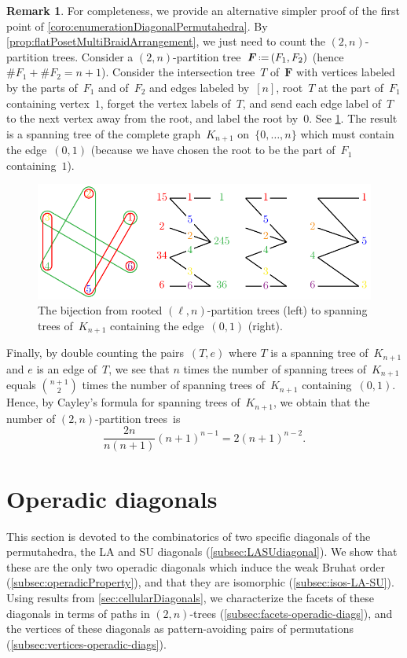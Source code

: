 \documentclass{amsart}
\theoremstyle{definition}
\newtheorem{remark}[theorem]{Remark}
\renewcommand{\b}[1]{{\boldsymbol{#1}}} %
\newcommand{\eqdef}{\mbox{\,\raisebox{0.2ex}{\scriptsize\ensuremath{\mathrm:}}\ensuremath{=}\,}} %
\renewcommand{\b}[1]{\boldsymbol{#1}} %
\begin{document}
\begin{remark}
For completeness, we provide an alternative simpler proof of the first point of \cref{coro:enumerationDiagonalPermutahedra}.
By \cref{prop:flatPosetMultiBraidArrangement}, we just need to count the $(2,n)$-partition trees.
Consider a $(2,n)$-partition tree~$\b{F} \eqdef (F_1,F_2)$ (hence~$\# F_1 + \# F_2 = n + 1$).
Consider the intersection tree~$T$ of~$\b{F}$ with vertices labeled by the parts of~$F_1$ and of~$F_2$ and edges labeled by~$[n]$, root~$T$ at the part of~$F_1$ containing vertex~$1$, forget the vertex labels of~$T$, and send each edge label of~$T$ to the next vertex away from the root, and label the root by~$0$.
See \cref{fig:tree}.
The result is a spanning tree of the complete graph~$K_{n+1}$ on~$\{0, \dots, n\}$ which must contain the edge~$(0,1)$ (because we have chosen the root to be the part of~$F_1$ containing~$1$).
%
\begin{figure}
	\centerline{\includegraphics[scale=1]{tree}}
	\caption{The bijection from rooted $(\ell,n)$-partition trees (left) to spanning trees of~$K_{n+1}$ containing the edge~$(0,1)$ (right).}
	\label{fig:tree}
\end{figure}
%
Finally, by double counting the pairs~$(T,e)$ where $T$ is a spanning tree of~$K_{n+1}$ and $e$ is an edge of~$T$, we see that $n$ times the number of spanning trees of~$K_{n+1}$ equals $\binom{n+1}{2}$ times the number of spanning trees of~$K_{n+1}$ containing~$(0,1)$.
Hence, by Cayley's formula for spanning trees of~$K_{n+1}$, we obtain that the number of $(2,n)$-partition trees~is
\[
\frac{2n}{n(n+1)} (n+1)^{n-1} = 2 (n + 1)^{n-2}.
\]
\end{remark}


\newpage
\section{Operadic diagonals}
\label{sec:operadicDiagonals}

This section is devoted to the combinatorics of two specific diagonals of the permutahedra, the LA and SU diagonals (\cref{subsec:LASUdiagonal}).
We show that these are the only two operadic diagonals which induce the weak Bruhat order (\cref{subsec:operadicProperty}), and that they are isomorphic (\cref{subsec:isos-LA-SU}). 
Using results from \cref{sec:cellularDiagonals}, we characterize the facets of these diagonals in terms of paths in $(2,n)$-trees (\cref{subsec:facets-operadic-diags}), and the vertices of these diagonals as pattern-avoiding pairs of permutations (\cref{subsec:vertices-operadic-diags}).
\end{document}
